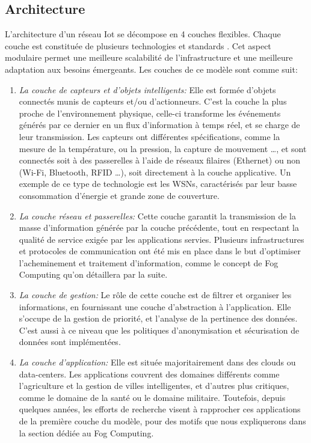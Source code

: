 \subsection{Architecture}
L'architecture d'un réseau Iot se décompose en 4 couches flexibles. Chaque couche est constituée de plusieurs technologies et standards \cite{patel2016}. Cet aspect modulaire permet une meilleure scalabilité de l'infrastructure et une meilleure adaptation aux besoins émergeants. Les couches de ce modèle sont comme suit:
\begin{enumerate}
  \item \emph{La couche de capteurs et d'objets intelligents:} Elle est formée d'objets connectés munis de capteurs et/ou d'actionneurs. C'est la couche la plus proche de l'environnement physique, celle-ci transforme les événements générés par ce dernier en un flux d'information à temps réel, et se charge de leur transmission. Les capteurs ont différentes spécifications, comme la mesure de la température, ou la pression, la capture de mouvement …, et sont connectés soit à des passerelles à l'aide de réseaux filaires (Ethernet) ou non (Wi-Fi, Bluetooth, RFID …), soit directement à la couche applicative. Un exemple de ce type de technologie est les WSNs, caractérisés par leur basse consommation d'énergie et grande zone de couverture.
  \item \emph{La couche réseau et passerelles:} Cette couche garantit la transmission de la masse d'information générée par la couche précédente, tout en respectant la qualité de service exigée par les applications servies. Plusieurs infrastructures et protocoles de communication ont été mis en place dans le but d'optimiser l'acheminement et traitement d'information, comme le concept de Fog Computing qu'on détaillera par la suite.
  \item \emph{La couche de gestion:} Le rôle de cette couche est de filtrer et organiser les informations, en fournissant une couche d'abstraction à l'application. Elle s'occupe de la gestion de priorité, et l'analyse de la pertinence des données. C'est aussi à ce niveau que les politiques d'anonymisation et sécurisation de données sont implémentées.
  \item \emph{La couche d'application:} Elle est située majoritairement dans des clouds ou data-centers. Les applications couvrent des domaines différents comme l'agriculture et la gestion de villes intelligentes, et d'autres plus critiques, comme le domaine de la santé ou le domaine militaire. Toutefois, depuis quelques années, les efforts de recherche visent à rapprocher ces applications de la première couche du modèle, pour des motifs que nous expliquerons dans la section dédiée au Fog Computing. 
\end{enumerate}

